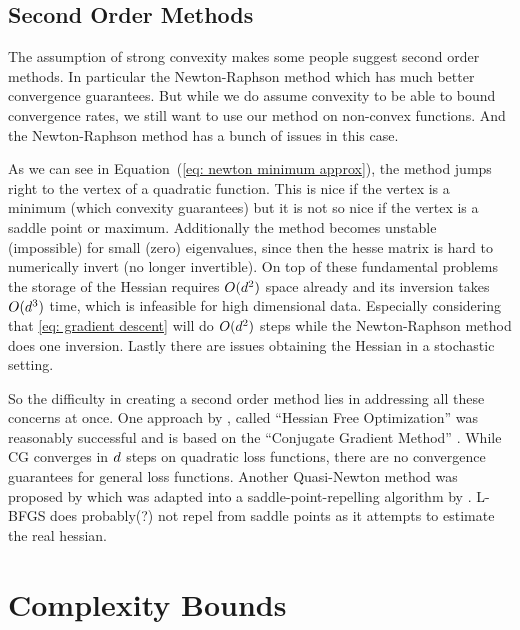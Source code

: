 \subsection{Second Order Methods}

The assumption of strong convexity makes some people suggest second order
methods. In particular the Newton-Raphson method which has much better
convergence guarantees. But while we do assume convexity to be able to bound
convergence rates, we still want to use our method on non-convex functions. And
the Newton-Raphson method has a bunch of issues in this case.

As we can see in Equation~(\ref{eq: newton minimum approx}), the method jumps right to the
vertex of a quadratic function. This is nice if the vertex is a minimum
(which convexity guarantees) but it is not so nice if the vertex is a saddle point
or maximum. Additionally the method becomes unstable (impossible) for small 
(zero) eigenvalues, since then the hesse matrix is hard to numerically invert (no
longer invertible).
On top of these fundamental problems the storage of the Hessian requires
\(O(d^2)\) space already and its inversion takes \(O(d^3)\)
time, which is infeasible for high dimensional data. Especially considering that
\ref{eq: gradient descent} will do \(O(d^2)\) steps while the Newton-Raphson
method does one inversion. Lastly there are issues obtaining the Hessian in a
stochastic setting.

So the difficulty in creating a second order method lies in addressing all these
concerns at once. One approach by \textcite{martensDeepLearningHessianfree2010},
called ``Hessian Free Optimization'' was reasonably successful and is based on
the ``Conjugate Gradient Method'' \parencite[for an introduction see
e.g.][]{shewchukIntroductionConjugateGradient1994}.
While CG converges in \(d\) steps on quadratic loss functions, there
are no convergence guarantees for general loss functions. Another Quasi-Newton
method was proposed by \textcite{vinyalsKrylovSubspaceDescent2012} which was
adapted into a saddle-point-repelling algorithm by
\textcite{dauphinIdentifyingAttackingSaddle2014}. L-BFGS
\parencite[e.g.][]{haghighiNumericalOptimizationUnderstanding2014} does probably(?)
not repel from saddle points as it attempts to estimate the real hessian.






\section{Complexity Bounds}\label{sec: complexity bounds}

